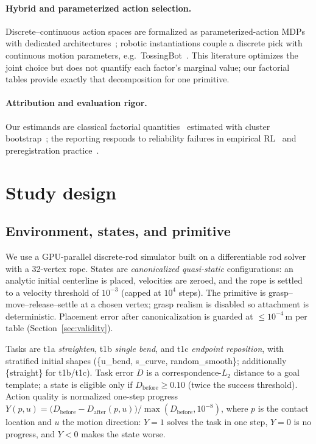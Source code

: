 \documentclass{article}
\begin{document}
\paragraph{Hybrid and parameterized action selection.}
Discrete--continuous action spaces are formalized as parameterized-action
MDPs~\citep{masson2016reinforcement} with dedicated
architectures~\citep{hausknecht2016deep}; robotic instantiations couple a
discrete pick with continuous motion parameters,
e.g.\ TossingBot~\citep{zeng2020tossingbot}. This literature optimizes the
joint choice but does not quantify each factor's marginal value; our
factorial tables provide exactly that decomposition for one primitive.

\paragraph{Attribution and evaluation rigor.}
Our estimands are classical factorial
quantities~\citep{montgomery2017design} estimated with cluster
bootstrap~\citep{efron1993introduction}; the reporting responds to
reliability failures in empirical
RL~\citep{henderson2018deep,agarwal2021statistical} and preregistration
practice~\citep{nosek2018preregistration}.

\section{Study design}
\subsection{Environment, states, and primitive}
We use a GPU-parallel discrete-rod simulator built on a differentiable rod
solver~\citep{cao2026dlolab} with a 32-vertex rope. States are
\emph{canonicalized quasi-static} configurations: an analytic initial
centerline is placed, velocities are zeroed, and the rope is settled to a
velocity threshold of $10^{-3}$ (capped at $10^4$ steps). The primitive is
grasp--move--release--settle at a chosen vertex; grasp realism is disabled
so attachment is deterministic. Placement error after canonicalization is
guarded at $\le 10^{-4}$\,m per table (Section~\ref{sec:validity}).

Tasks are t1a \emph{straighten}, t1b \emph{single bend}, and t1c
\emph{endpoint reposition}, with stratified initial shapes (\{u\_bend,
s\_curve, random\_smooth\}; additionally \{straight\} for t1b/t1c). Task
error $D$ is a correspondence-$L_2$ distance to a goal template; a state is
eligible only if $D_{\text{before}} \ge 0.10$ (twice the success
threshold). Action quality is normalized one-step progress
$Y(p,u) = \bigl(D_{\text{before}} - D_{\text{after}}(p,u)\bigr)/
\max(D_{\text{before}}, 10^{-8})$, where $p$ is the contact location and
$u$ the motion direction: $Y=1$ solves the task in one step, $Y=0$ is no
progress, and $Y<0$ makes the state worse.
\end{document}
